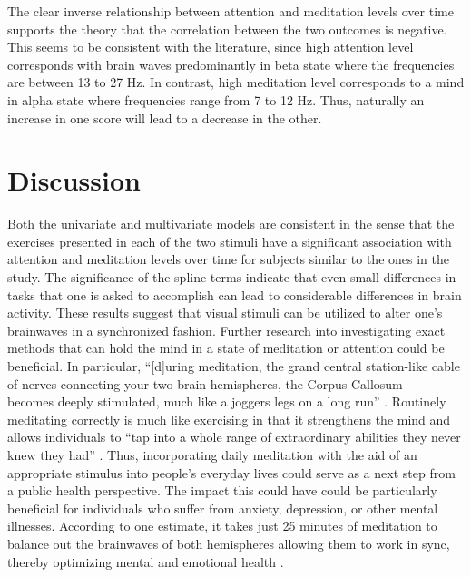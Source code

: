 \documentclass{article}[12pt]
\begin{document}
The clear inverse relationship between attention and meditation levels over time supports the theory that the correlation between the two outcomes is negative. This seems to be consistent with the literature, since high attention level corresponds with brain waves predominantly in beta state where the frequencies are between 13 to 27 Hz. In contrast, high meditation level corresponds to a mind in alpha state where frequencies range from 7 to 12 Hz. Thus, naturally an increase in one score will lead to a decrease in the other.

\section{Discussion}

Both the univariate and multivariate models are consistent in the sense that the exercises presented in each of the two stimuli have a significant association with attention and meditation levels over time for subjects similar to the ones in the study.  The significance of the spline terms indicate that even small differences in tasks that one is asked to accomplish can lead to considerable differences in brain activity.  These results suggest that visual stimuli can be utilized to alter one's brainwaves in a synchronized fashion. Further research into investigating exact methods that can hold the mind in a state of meditation or attention could be beneficial. In particular,
``[d]uring meditation, the grand central station-like cable of nerves connecting your two brain hemispheres, the Corpus Callosum --- becomes deeply stimulated, much like a joggers legs on a long run'' \cite{infinisync}.  Routinely meditating correctly is much like exercising in that it strengthens the mind and allows individuals to ``tap into a whole range of extraordinary abilities they never knew they had'' \cite{infinisync}. Thus, incorporating daily meditation with the aid of an appropriate stimulus into people's everyday lives could serve as a next step from a public health perspective.  The impact this could have could be particularly beneficial for individuals who suffer from anxiety, depression, or other mental illnesses. According to one estimate, it takes just 25 minutes of meditation to balance out the brainwaves of both hemispheres allowing them to work in sync, thereby optimizing mental and emotional health \cite{infinisync}.
\end{document}
